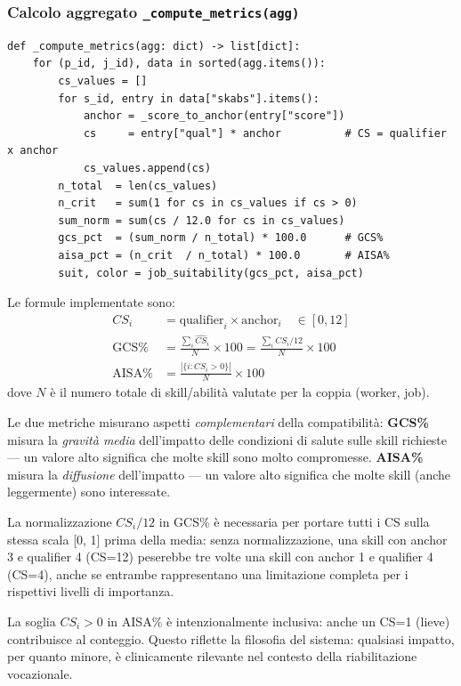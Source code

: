 \documentclass[a4paper,12pt]{article}
\begin{document}
\subsubsection{Calcolo aggregato \texttt{\_compute\_metrics(agg)}}

\begin{lstlisting}[caption={Calcolo di GCS\% e AISA\% dall'aggregazione.}]
def _compute_metrics(agg: dict) -> list[dict]:
    for (p_id, j_id), data in sorted(agg.items()):
        cs_values = []
        for s_id, entry in data["skabs"].items():
            anchor = _score_to_anchor(entry["score"])
            cs     = entry["qual"] * anchor          # CS = qualifier x anchor
            cs_values.append(cs)
        n_total  = len(cs_values)
        n_crit   = sum(1 for cs in cs_values if cs > 0)
        sum_norm = sum(cs / 12.0 for cs in cs_values)
        gcs_pct  = (sum_norm / n_total) * 100.0      # GCS%
        aisa_pct = (n_crit  / n_total) * 100.0       # AISA%
        suit, color = job_suitability(gcs_pct, aisa_pct)
\end{lstlisting}

\noindent Le formule implementate sono:
\begin{align}
  CS_i &= \text{qualifier}_i \times \text{anchor}_i \quad \in [0, 12] \\
  \text{GCS\%} &= \frac{\sum_i \widehat{CS}_i}{N} \times 100
               = \frac{\sum_i CS_i / 12}{N} \times 100 \\
  \text{AISA\%} &= \frac{|\{i : CS_i > 0\}|}{N} \times 100
\end{align}
dove $N$ \`{e} il numero totale di skill/abilit\`{a} valutate per la
coppia (worker, job).

Le due metriche misurano aspetti \textit{complementari} della compatibilit\`{a}:
\textbf{GCS\%} misura la \textit{gravit\`{a} media} dell'impatto delle
condizioni di salute sulle skill richieste --- un valore alto significa
che molte skill sono molto compromesse. \textbf{AISA\%} misura la
\textit{diffusione} dell'impatto --- un valore alto significa che molte
skill (anche leggermente) sono interessate.

La normalizzazione $CS_i/12$ in GCS\% \`{e} necessaria per portare tutti
i CS sulla stessa scala [0, 1] prima della media: senza normalizzazione,
una skill con anchor 3 e qualifier 4 (CS=12) peserebbe tre volte una
skill con anchor 1 e qualifier 4 (CS=4), anche se entrambe rappresentano
una limitazione completa per i rispettivi livelli di importanza.

La soglia $CS_i > 0$ in AISA\% \`{e} intenzionalmente inclusiva: anche
un CS=1 (lieve) contribuisce al conteggio. Questo riflette la filosofia
del sistema: qualsiasi impatto, per quanto minore, \`{e} clinicamente
rilevante nel contesto della riabilitazione vocazionale.
\end{document}
